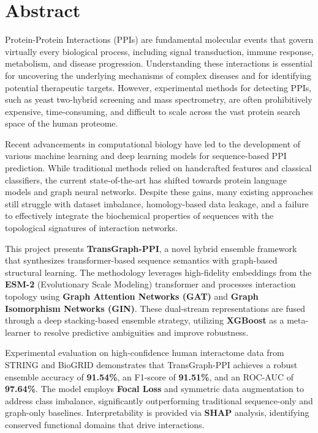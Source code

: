 \documentclass[12pt,a4paper]{report}
\begin{document}
\pagestyle{plain}
\chapter*{\centering Abstract}

{

\noindent Protein-Protein Interactions (PPIs) are fundamental molecular events that govern virtually every biological process, including signal transduction, immune response, metabolism, and disease progression. Understanding these interactions is essential for uncovering the underlying mechanisms of complex diseases and for identifying potential therapeutic targets. However, experimental methods for detecting PPIs, such as yeast two-hybrid screening and mass spectrometry, are often prohibitively expensive, time-consuming, and difficult to scale across the vast protein search space of the human proteome.

\par \vspace{0.15in}
\noindent Recent advancements in computational biology have led to the development of various machine learning and deep learning models for sequence-based PPI prediction. While traditional methods relied on handcrafted features and classical classifiers, the current state-of-the-art has shifted towards protein language models and graph neural networks. Despite these gains, many existing approaches still struggle with dataset imbalance, homology-based data leakage, and a failure to effectively integrate the biochemical properties of sequences with the topological signatures of interaction networks.

\par \vspace{0.15in}
\noindent This project presents \textbf{TransGraph-PPI}, a novel hybrid ensemble framework that synthesizes transformer-based sequence semantics with graph-based structural learning. The methodology leverages high-fidelity embeddings from the \textbf{ESM-2} (Evolutionary Scale Modeling) transformer and processes interaction topology using \textbf{Graph Attention Networks (GAT)} and \textbf{Graph Isomorphism Networks (GIN)}. These dual-stream representations are fused through a deep stacking-based ensemble strategy, utilizing \textbf{XGBoost} as a meta-learner to resolve predictive ambiguities and improve robustness.

\par \vspace{0.15in}
\noindent Experimental evaluation on high-confidence human interactome data from STRING and BioGRID demonstrates that TransGraph-PPI achieves a robust ensemble accuracy of \textbf{91.54\%}, an F1-score of \textbf{91.51\%}, and an ROC-AUC of \textbf{97.64\%}. The model employs \textbf{Focal Loss} and symmetric data augmentation to address class imbalance, significantly outperforming traditional sequence-only and graph-only baselines. Interpretability is provided via \textbf{SHAP} analysis, identifying conserved functional domains that drive interactions.

}
\end{document}
